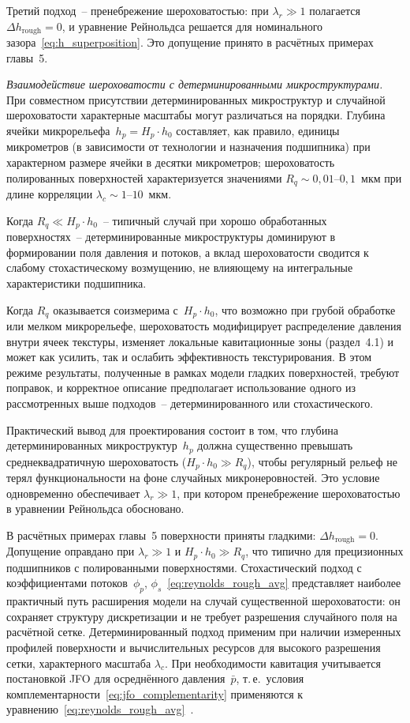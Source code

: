 Третий подход~-- пренебрежение шероховатостью: при $\lambda_r \gg 1$
полагается $\Delta h_{\mathrm{rough}} = 0$, и уравнение Рейнольдса
решается для номинального зазора~\eqref{eq:h_superposition}. Это
допущение принято в расчётных примерах главы~5.

\textit{Взаимодействие шероховатости с детерминированными
микроструктурами.}
При совместном присутствии детерминированных микроструктур
и случайной шероховатости характерные масштабы могут различаться
на порядки. Глубина ячейки микрорельефа~$h_p = H_p \cdot h_0$
составляет, как правило, единицы микрометров (в зависимости от технологии и назначения подшипника) при характерном размере
ячейки в десятки микрометров; шероховатость полированных
поверхностей характеризуется значениями $R_q \sim 0{,}01\text{--}0{,}1$~мкм
при длине корреляции $\lambda_c \sim 1\text{--}10$~мкм.

Когда $R_q \ll H_p \cdot h_0$~-- типичный случай при хорошо
обработанных поверхностях~-- детерминированные микроструктуры
доминируют в формировании поля давления и потоков, а вклад
шероховатости сводится к слабому стохастическому возмущению,
не влияющему на интегральные характеристики подшипника.

Когда $R_q$ оказывается соизмерима с~$H_p \cdot h_0$, что
возможно при грубой обработке или мелком микрорельефе,
шероховатость модифицирует распределение давления внутри ячеек
текстуры, изменяет локальные кавитационные зоны
(раздел~4.1) и может как усилить, так и ослабить эффективность
текстурирования. В этом режиме результаты, полученные в рамках
модели гладких поверхностей, требуют поправок, и корректное
описание предполагает использование одного из рассмотренных выше
подходов~-- детерминированного или стохастического.

Практический вывод для проектирования состоит в том, что
глубина детерминированных микроструктур~$h_p$ должна существенно
превышать среднеквадратичную шероховатость ($H_p \cdot h_0 \gg R_q$),
чтобы регулярный рельеф не терял функциональности на фоне случайных
микронеровностей. Это условие одновременно обеспечивает
$\lambda_r \gg 1$, при котором пренебрежение шероховатостью
в уравнении Рейнольдса обосновано.

В расчётных примерах главы~5 поверхности приняты гладкими:
$\Delta h_{\mathrm{rough}} = 0$. Допущение оправдано при
$\lambda_r \gg 1$ и $H_p \cdot h_0 \gg R_q$, что типично
для прецизионных подшипников с полированными поверхностями.
Стохастический подход с коэффициентами потоков~$\phi_p$,
$\phi_s$~\eqref{eq:reynolds_rough_avg} представляет наиболее
практичный путь расширения модели на случай существенной
шероховатости: он сохраняет структуру дискретизации и не требует
разрешения случайного поля на расчётной сетке.
Детерминированный подход применим при наличии измеренных профилей
поверхности и вычислительных ресурсов для высокого разрешения
сетки, характерного масштаба $\lambda_c$.
При необходимости кавитация учитывается постановкой JFO для осреднённого давления~$\bar{p}$, т.\,е.\ условия комплементарности~\eqref{eq:jfo_complementarity} применяются к уравнению~\eqref{eq:reynolds_rough_avg}~\cite{gu2017,nie2022}.

